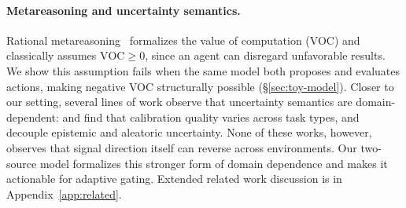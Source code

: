 \paragraph{Metareasoning and uncertainty semantics.}
Rational metareasoning~\cite{russell1991right, desabbata2024metareasoning} formalizes the value of computation (VOC) and classically assumes $\text{VOC} \geq 0$, since an agent can disregard unfavorable results. We show this assumption fails when the same model both proposes and evaluates actions, making negative VOC structurally possible (\S\ref{sec:toy-model}). Closer to our setting, several lines of work observe that uncertainty semantics are domain-dependent: \citet{tao2025revisiting} and \citet{heo2025llmuncertainty} find that calibration quality varies across task types, and \citet{yadkori2024believe} decouple epistemic and aleatoric uncertainty. None of these works, however, observes that signal direction itself can reverse across environments. Our two-source model formalizes this stronger form of domain dependence and makes it actionable for adaptive gating. Extended related work discussion is in Appendix~\ref{app:related}.